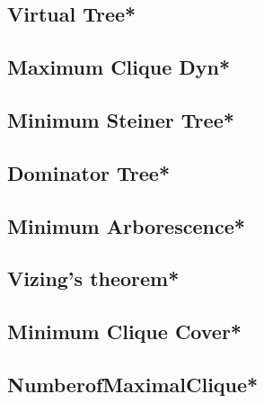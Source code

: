 \subsection{Virtual Tree*} %

\subsection{Maximum Clique Dyn*} %
 
\subsection{Minimum Steiner Tree*} %

\subsection{Dominator Tree*} %

\subsection{Minimum Arborescence*} %

\subsection{Vizing's theorem*} %
 
\subsection{Minimum Clique Cover*} %

\subsection{NumberofMaximalClique*} %



